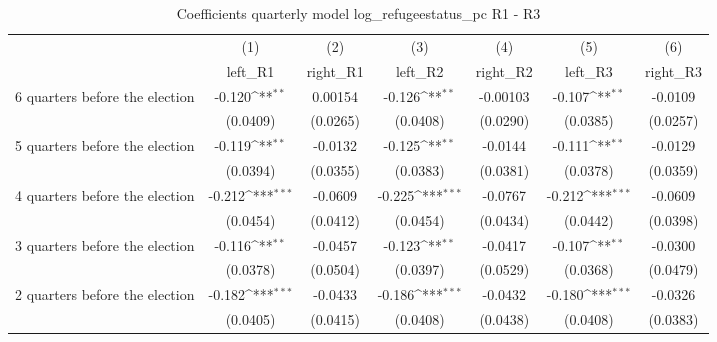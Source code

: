\begin{table}[htbp]\centering
\def\sym#1{\ifmmode^{#1}\else\(^{#1}\)\fi}
\caption{Coefficients quarterly model log\_refugeestatus\_pc R1 - R3}
\begin{tabular}{l*{6}{c}}
\hline\hline
                    &\multicolumn{1}{c}{(1)}&\multicolumn{1}{c}{(2)}&\multicolumn{1}{c}{(3)}&\multicolumn{1}{c}{(4)}&\multicolumn{1}{c}{(5)}&\multicolumn{1}{c}{(6)}\\
                    &\multicolumn{1}{c}{left\_R1}&\multicolumn{1}{c}{right\_R1}&\multicolumn{1}{c}{left\_R2}&\multicolumn{1}{c}{right\_R2}&\multicolumn{1}{c}{left\_R3}&\multicolumn{1}{c}{right\_R3}\\
\hline
 6 quarters before the election&      -0.120\sym{**} &     0.00154         &      -0.126\sym{**} &    -0.00103         &      -0.107\sym{**} &     -0.0109         \\
                    &    (0.0409)         &    (0.0265)         &    (0.0408)         &    (0.0290)         &    (0.0385)         &    (0.0257)         \\
[1em]
 5 quarters before the election&      -0.119\sym{**} &     -0.0132         &      -0.125\sym{**} &     -0.0144         &      -0.111\sym{**} &     -0.0129         \\
                    &    (0.0394)         &    (0.0355)         &    (0.0383)         &    (0.0381)         &    (0.0378)         &    (0.0359)         \\
[1em]
 4 quarters before the election&      -0.212\sym{***}&     -0.0609         &      -0.225\sym{***}&     -0.0767         &      -0.212\sym{***}&     -0.0609         \\
                    &    (0.0454)         &    (0.0412)         &    (0.0454)         &    (0.0434)         &    (0.0442)         &    (0.0398)         \\
[1em]
 3 quarters before the election&      -0.116\sym{**} &     -0.0457         &      -0.123\sym{**} &     -0.0417         &      -0.107\sym{**} &     -0.0300         \\
                    &    (0.0378)         &    (0.0504)         &    (0.0397)         &    (0.0529)         &    (0.0368)         &    (0.0479)         \\
[1em]
 2 quarters before the election&      -0.182\sym{***}&     -0.0433         &      -0.186\sym{***}&     -0.0432         &      -0.180\sym{***}&     -0.0326         \\
                    &    (0.0405)         &    (0.0415)         &    (0.0408)         &    (0.0438)         &    (0.0408)         &    (0.0383)         \\

\end{tabular}
\end{table}
